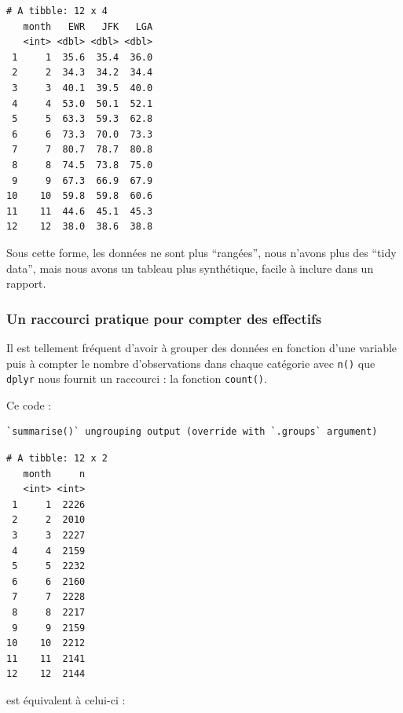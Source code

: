 \documentclass[
  a4paper,
]{article}
\newenvironment{Shaded}{\begin{snugshade}}{\end{snugshade}}
\newcommand{\DataTypeTok}[1]{\textcolor[rgb]{0.00,0.34,0.68}{#1}}
\newcommand{\KeywordTok}[1]{\textcolor[rgb]{0.12,0.11,0.11}{\textbf{#1}}}
\newcommand{\NormalTok}[1]{\textcolor[rgb]{0.12,0.11,0.11}{#1}}
\newcommand{\OperatorTok}[1]{\textcolor[rgb]{0.12,0.11,0.11}{#1}}
\newcommand{\StringTok}[1]{\textcolor[rgb]{0.75,0.01,0.01}{#1}}
\begin{document}
\begin{verbatim}
# A tibble: 12 x 4
   month   EWR   JFK   LGA
   <int> <dbl> <dbl> <dbl>
 1     1  35.6  35.4  36.0
 2     2  34.3  34.2  34.4
 3     3  40.1  39.5  40.0
 4     4  53.0  50.1  52.1
 5     5  63.3  59.3  62.8
 6     6  73.3  70.0  73.3
 7     7  80.7  78.7  80.8
 8     8  74.5  73.8  75.0
 9     9  67.3  66.9  67.9
10    10  59.8  59.8  60.6
11    11  44.6  45.1  45.3
12    12  38.0  38.6  38.8
\end{verbatim}

Sous cette forme, les données ne sont plus ``rangées'', nous n'avons plus des ``tidy data'', mais nous avons un tableau plus synthétique, facile à inclure dans un rapport.

\hypertarget{un-raccourci-pratique-pour-compter-des-effectifs}{%
\subsubsection{Un raccourci pratique pour compter des effectifs}\label{un-raccourci-pratique-pour-compter-des-effectifs}}

Il est tellement fréquent d'avoir à grouper des données en fonction d'une variable puis à compter le nombre d'observations dans chaque catégorie avec \texttt{n()} que \texttt{dplyr} nous fournit un raccourci : la fonction \texttt{count()}.

Ce code :

\begin{Shaded}
\end{Shaded}

\begin{verbatim}
`summarise()` ungrouping output (override with `.groups` argument)
\end{verbatim}

\begin{verbatim}
# A tibble: 12 x 2
   month     n
   <int> <int>
 1     1  2226
 2     2  2010
 3     3  2227
 4     4  2159
 5     5  2232
 6     6  2160
 7     7  2228
 8     8  2217
 9     9  2159
10    10  2212
11    11  2141
12    12  2144
\end{verbatim}

est équivalent à celui-ci :
\end{document}
